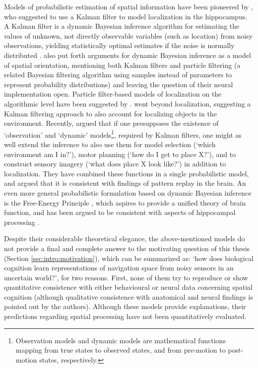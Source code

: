 
Models of probabilistic estimation of spatial information have been pioneered by \citep{bousquet1997hippocampus}, who suggested to use a Kalman filter to model localization in the hippocampus. A Kalman filter is a dynamic Bayesian inference algorithm for estimating the values of unknown, not directly observable variables (such as location) from noisy observations, yielding statistically optimal estimates if the noise is normally distributed \citep{kalman1960new}. \citet{macneilage2008computational} also put forth arguments for dynamic Bayesian inference as a model of spatial orientation, mentioning both Kalman filters and particle filtering (a related Bayesian filtering algorithm using samples instead of parameters to represent probability distributions) and leaving the question of their neural implementation open. Particle filter-based models of localization on the algorithmic level have been suggested by \citep{fox2010hippocampus, cheung2012maintaining}. \citet{osborn2010kalman} went beyond localization, suggesting a Kalman filtering approach to also account for localizing objects in the environment. Recently, \citet{penny2013forward} argued that if one presupposes the existence of `observation' and `dynamic' models\footnote{Observation models and dynamic models are mathematical functions mapping from true states to observed states, and from pre-motion to post-motion states, respectively.}, required by Kalman filters, one might as well extend the inference to also use them for model selection (`which environment am I in?'), motor planning (`how do I get to place X?'), and to construct sensory imagery (`what does place X look like?') in addition to localization. They have combined these functions in a single probabilistic model, and argued that it is consistent with findings of pattern replay in the brain. An even more general probabilistic formulation based on dynamic Bayesian inference is the Free-Energy Principle \citep{friston2006free}, which aspires to provide a unified theory of brain function, and has been argued to be consistent with aspects of hippocampal processing \citep{friston2011action}.

Despite their considerable theoretical elegance, the above-mentioned models do not provide a final and complete answer to the motivating question of this thesis (Section \ref{sec:intro:motivation}), which can be summarized as: `how does biological cognition learn representations of navigation space from noisy sensors in an uncertain world?', for two reasons. First, none of them try to reproduce or show quantitative consistence with either behavioural or neural data concerning spatial cognition (although qualitative consistence with anatomical and neural findings is pointed out by the authors). Although these models provide explanations, their predictions regarding spatial processing have not been quantitatively evaluated.

